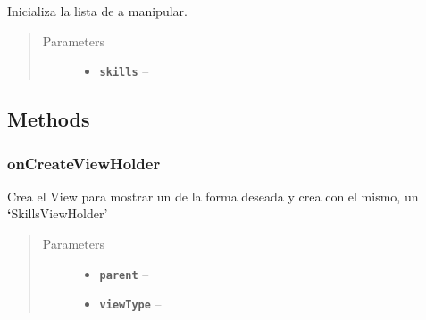 \documentclass[letterpaper,10pt,english]{sphinxmanual}
\begin{document}
\begin{fulllineitems}
\label{Adapter/SkillsAdapter:com.fiuba.tallerii.jobify.SkillsAdapter.SkillsAdapter(List)}
Inicializa la lista de  a manipular.
\begin{quote}\begin{description}
\item[{Parameters}] \leavevmode\begin{itemize}
\item {} 
\textbf{\texttt{skills}} -- 

\end{itemize}

\end{description}\end{quote}

\end{fulllineitems}



\subsection{Methods}
\label{Adapter/SkillsAdapter:methods}

\subsubsection{onCreateViewHolder}
\label{Adapter/SkillsAdapter:oncreateviewholder}

\begin{fulllineitems}
\label{Adapter/SkillsAdapter:com.fiuba.tallerii.jobify.SkillsAdapter.onCreateViewHolder(ViewGroup, int)}
Crea el View para mostrar un  de la forma deseada y crea con el mismo, un {\color{red}\bfseries{}{}`}SkillsViewHolder'
\begin{quote}\begin{description}
\item[{Parameters}] \leavevmode\begin{itemize}
\item {} 
\textbf{\texttt{parent}} -- 

\item {} 
\textbf{\texttt{viewType}} -- 

\end{itemize}

\end{description}\end{quote}

\end{fulllineitems}
\end{document}
